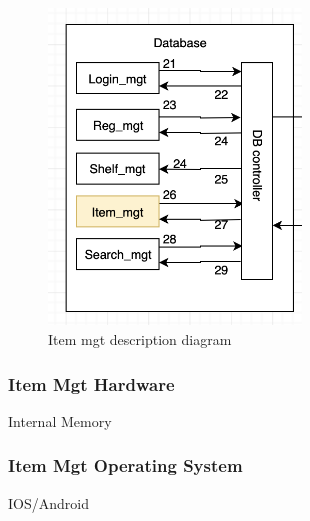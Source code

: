 \begin{figure}[h!]
	\centering
 	\includegraphics[width=0.60\textwidth]{images/itemmgt}
 \caption{Item mgt description diagram}
\end{figure}

\subsubsection{Item Mgt Hardware}
Internal Memory

\subsubsection{Item Mgt Operating System}
IOS/Android



























































